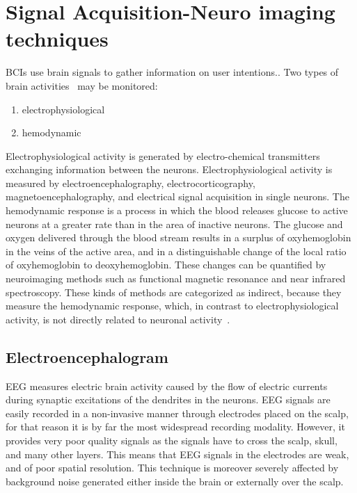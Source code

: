 \section{Signal Acquisition-Neuro imaging techniques}\label{ch2:4}

BCIs use brain signals to gather information on user intentions.. Two types of brain activities~\cite{5} may be monitored: 

\begin{enumerate}
\item electrophysiological
\item hemodynamic
\end{enumerate}

Electrophysiological activity is generated by electro-chemical transmitters exchanging information between the neurons. Electrophysiological activity is measured by electroencephalography, electrocorticography, magnetoencephalography, and electrical signal acquisition in single neurons. The hemodynamic response is a process in which the blood releases glucose to active neurons at a greater rate than in the area of inactive neurons. The glucose and oxygen delivered through the blood stream results in a surplus of oxyhemoglobin in the veins of the active area, and in a distinguishable change of the local ratio of oxyhemoglobin to deoxyhemoglobin. These changes can be quantified by neuroimaging methods such as functional magnetic resonance and near infrared spectroscopy. These kinds of methods are categorized as indirect, because they measure the hemodynamic response, which, in contrast to electrophysiological activity, is not directly related to neuronal activity~\cite{2}.

\subsection{Electroencephalogram}\label{ch2:5}

EEG measures electric brain activity caused by the flow of electric currents during synaptic excitations of the dendrites in the neurons. EEG signals are easily recorded in a non-invasive manner through electrodes placed on the scalp, for that reason it is by far the most widespread recording modality. However, it provides very poor quality signals as the signals have to cross the scalp, skull, and many other layers. This means that EEG signals in the electrodes are weak, and of poor spatial resolution. This technique is moreover severely affected by background noise generated either inside the brain or externally over the scalp.


